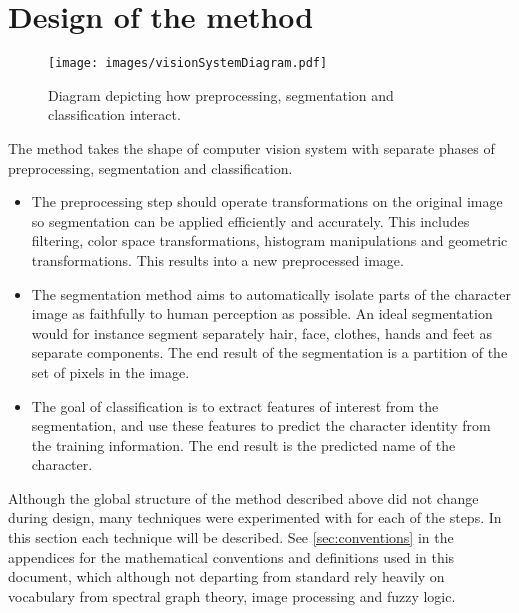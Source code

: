 \section{Design of the method}

\begin{figure}[htb!]
\centerline{
\texttt{[image: images/visionSystemDiagram.pdf]}
}
\caption{Diagram depicting how preprocessing, segmentation and classification interact.}
\end{figure}

The method takes the shape of computer vision system with separate phases of preprocessing, segmentation and classification.

\begin{itemize}
\item The preprocessing step should operate transformations on the original image so segmentation can be applied efficiently and accurately. This includes filtering, color space transformations, histogram manipulations and geometric transformations. This results into a new preprocessed image.
\item The segmentation method aims to automatically isolate parts of the character image as faithfully to human perception as possible. An ideal segmentation would for instance segment separately hair, face, clothes, hands and feet as separate components.
The end result of the segmentation is a partition of the set of pixels in the image.
\item The goal of classification is to extract features of interest from the segmentation, and use these features to predict the character identity from the training information. The end result is the predicted name of the character.
\end{itemize}

Although the global structure of the method described above did not change during design, many techniques were experimented with for each of the steps. In this section each technique will be described. See \autoref{sec:conventions} in the appendices for the mathematical conventions and definitions used in this document, which although not departing from standard rely heavily on vocabulary from spectral graph theory, image processing and fuzzy logic.







